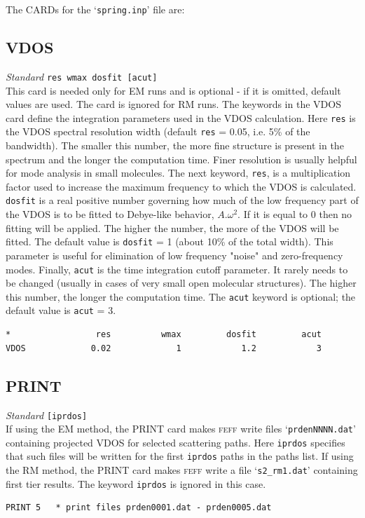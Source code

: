 \documentclass[11pt,oneside]{report} %
\newcommand{\program}[1]{\textsc{#1}}
\newcommand{\feff}{\program{feff}}
\newenvironment{Card}[4]%
      {\vspace{3ex}%
        \subsection{#1}
        \quad\textsl{#3}\newline
        \quad\texttt{#2}\newline%
        \label{card:#4}\\}
      {}
\newcommand{\file}[1]{`\texttt{#1}'}
\begin{document}
The CARDs for the \file{spring.inp} file are:

\begin{Card}{VDOS}{res wmax dosfit [acut]}{Standard}{spring-vdos}
  This card is needed only for EM runs and is optional - if it is omitted, default values are used.  The card is ignored for RM runs.  The keywords in the VDOS card define the integration parameters used in the
  VDOS calculation.  Here \texttt{res} is the VDOS spectral resolution width (default \texttt{res} = 0.05, i.e. 5\% of the bandwidth).  The smaller this number, the more fine structure is present in the spectrum and the longer the computation time.  Finer resolution is usually helpful for mode analysis in small molecules.  The next keyword, \texttt{res}, is a multiplication factor used to increase the maximum frequency to which the VDOS is calculated.  \texttt{dosfit} is a real positive number governing how much of the low frequency part of the VDOS is to be fitted to Debye-like behavior, $A . \omega^2$.  If it is equal to 0 then no fitting will be applied.  The higher the number, the more of the VDOS will be fitted.  The default value is \texttt{dosfit} = 1 (about 10\% of the total width).  This parameter is useful for elimination of low frequency "noise" and zero-frequency modes.  Finally, \texttt{acut} is the time integration cutoff parameter.  It rarely needs to be changed (usually in cases of very small open molecular structures).  The higher this number, the longer the computation time.  The \texttt{acut} keyword is optional; the default value is \texttt{acut} = 3.
\begin{verbatim}
*                 res          wmax         dosfit         acut
VDOS             0.02             1            1.2            3
\end{verbatim}
\end{Card}


\begin{Card}{PRINT}{[iprdos]}{Standard}{spring-print}
  If using the EM method, the PRINT card makes {\feff} write files \file{prdenNNNN.dat} containing projected VDOS for selected scattering paths.  Here \texttt{iprdos} specifies that such files will be written for the first \texttt{iprdos} paths in the paths list.  If using the RM method, the PRINT card makes {\feff} write a file \file{s2\_rm1.dat} containing first tier results.  The keyword \texttt{iprdos} is ignored in this case.
\begin{verbatim}
PRINT 5   * print files prden0001.dat - prden0005.dat
\end{verbatim}
\end{Card}
\end{document}
